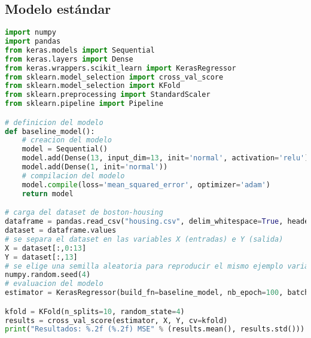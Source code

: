 \subsection{Modelo estándar}
\begin{lstlisting}[language=Python]
import numpy
import pandas
from keras.models import Sequential
from keras.layers import Dense
from keras.wrappers.scikit_learn import KerasRegressor
from sklearn.model_selection import cross_val_score
from sklearn.model_selection import KFold
from sklearn.preprocessing import StandardScaler
from sklearn.pipeline import Pipeline

# definicion del modelo
def baseline_model():
	# creacion del modelo
	model = Sequential()
	model.add(Dense(13, input_dim=13, init='normal', activation='relu'))
	model.add(Dense(1, init='normal'))
	# compilacion del modelo
	model.compile(loss='mean_squared_error', optimizer='adam')
	return model

# carga del dataset de boston-housing
dataframe = pandas.read_csv("housing.csv", delim_whitespace=True, header=None)
dataset = dataframe.values
# se separa el dataset en las variables X (entradas) e Y (salida)
X = dataset[:,0:13]
Y = dataset[:,13]
# se elige una semilla aleatoria para reproducir el mismo ejemplo varias veces
numpy.random.seed(4)
# evaluacion del modelo
estimator = KerasRegressor(build_fn=baseline_model, nb_epoch=100, batch_size=5, verbose=0)

kfold = KFold(n_splits=10, random_state=4)
results = cross_val_score(estimator, X, Y, cv=kfold)
print("Resultados: %.2f (%.2f) MSE" % (results.mean(), results.std()))
\end{lstlisting}

